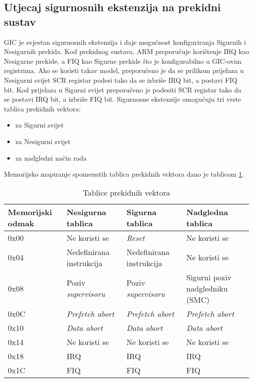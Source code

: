 \documentclass[times, utf8, diplomski, numeric]{fer}
\begin{document}
\subsection{Utjecaj sigurnosnih ekstenzija na prekidni sustav}
GIC je svjestan sigurnosnih ekstenzija i daje mogućnost konfiguriranja Sigurnih i Nesigurnih prekida. Kod prekidnog sustava,
ARM preporučuje korištenje IRQ kao Nesigurne prekide, a FIQ kao Sigurne prekide što je konfigurabilno u GIC-ovim registrima.
Ako se koristi takav model, preporučeno je da se prilikom prijelaza u Nesigurni svijet SCR registar podesi tako da se izbriše
IRQ bit, a postavi FIQ bit. Kod prijelaza u Sigurni svijet preporučeno je podesiti SCR registar tako da se postavi IRQ bit, a
izbriše FIQ bit.
Sigurnosne ekstenzije omogućuju tri vrste tablica prekidnih vektora:
\begin{itemize}
  \item{za Sigurni svijet}
  \item{za Nesigurni svijet}
  \item{za nadgledni način rada}
\end{itemize}
Memorijsko mapiranje spomenutih tablica prekidnih vektora dano je tablicom \ref{vector_table}.
\begin{table}[H]
  \centering
  \caption{Tablice prekidnih vektora}
  \label{vector_table}
  \begin{tabular}{|| p{2cm} | p{4cm} | p{4cm} | p{4cm} ||}
    \hline
    \textbf{Memorijski odmak} & \textbf{Nesigurna tablica} & \textbf{Sigurna tablica} & \textbf{Nadgledna tablica} \\
    \hline\hline
    0x00 & Ne koristi se & \textit{Reset} & Ne koristi se\\
    \hline
    0x04 & Nedefinirana instrukcija & Nedefinirana instrukcija & Ne koristi se\\
    \hline
    0x08 & Poziv \textit{supervisoru} & Poziv \textit{supervisoru} & Sigurni poziv nadgledniku (SMC)\\
    \hline
    0x0C & \textit{Prefetch abort} & \textit{Prefetch abort} & \textit{Prefetch abort}\\
    \hline
    0x10 & \textit{Data abort} & \textit{Data abort} & \textit{Data abort}\\
    \hline
    0x14 & Ne koristi se & Ne koristi se & Ne koristi se\\
    \hline
    0x18 & IRQ & IRQ & IRQ\\
    \hline
    0x1C & FIQ & FIQ & FIQ\\
    \hline
  \end{tabular}
\end{table}
\end{document}
